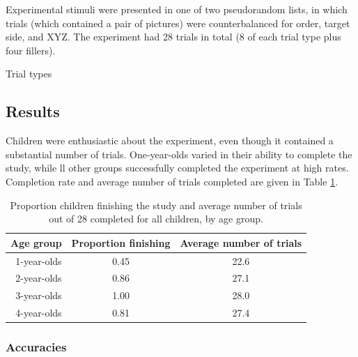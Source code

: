 \documentclass[man,noapacite]{apa2}
\begin{document}
Experimental stimuli were presented in one of two pseudorandom lists, in which trials (which contained a pair of pictures) were counterbalanced for order, target side, and XYZ. The experiment had 28 trials in total (8 of each trial type plus four fillers). 

Trial types

\subsection{Results}


Children were enthusiastic about the experiment, even though it contained a substantial number of trials. One-year-olds varied in their ability to complete the study, while ll other groups successfully completed the experiment at high rates. Completion rate and average number of trials completed are given in Table \ref{tab:completion}.

\begin{table}[t]
\centering
\caption{Proportion children finishing the study and average number of trials out of 28 completed for all children, by age group.\label{tab:completion}}

\begin{tabular}{rcc}
  \hline
Age group & Proportion finishing & Average number of trials \\ 
  \hline
1-year-olds & 0.45 & 22.6 \\ 
2-year-olds & 0.86 & 27.1 \\ 
3-year-olds & 1.00 & 28.0 \\ 
4-year-olds & 0.81 & 27.4 \\ 
   \hline
\end{tabular}
\end{table}

\subsubsection{Accuracies}
\end{document}
